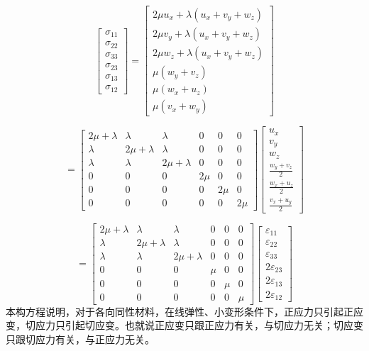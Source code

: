 \documentclass[12pt,a4paper]{article}
\begin{document}
$$
\begin{bmatrix}
\sigma_{11} \\ \sigma_{22} \\ \sigma_{33} \\ \sigma_{23} \\ \sigma_{13} \\ \sigma_{12}
\end{bmatrix} 
=\begin{bmatrix}
2\mu u_x + \lambda (u_x + v_y + w_z)\\
2\mu v_y + \lambda (u_x + v_y + w_z)\\
2\mu w_z + \lambda (u_x + v_y + w_z)\\
\mu (w_y + v_z) \\
\mu (w_x + u_z) \\
\mu (v_x + w_y)
\end{bmatrix}
$$

$$
=\begin{bmatrix}
2\mu+\lambda & \lambda & \lambda & 0 & 0 & 0\\
\lambda & 2\mu+\lambda  & \lambda & 0 & 0 & 0\\
\lambda &  \lambda & 2\mu+\lambda & 0 & 0 & 0 \\
0 & 0 & 0 & 2\mu & 0 & 0 \\
0 & 0 & 0 & 0 & 2\mu & 0 \\
0 & 0 & 0 & 0 & 0 & 2\mu
\end{bmatrix}
\begin{bmatrix}
u_x \\ v_y \\ w_z \\ \frac{w_y + v_z}{2} \\ \frac{w_x + u_z}{2} \\ \frac{v_x + u_y}{2}
\end{bmatrix}
$$

$$
= \begin{bmatrix}
2\mu+\lambda & \lambda & \lambda & 0 & 0 & 0\\
\lambda & 2\mu+\lambda  & \lambda & 0 & 0 & 0\\
\lambda &  \lambda & 2\mu+\lambda & 0 & 0 & 0 \\
0 & 0 & 0 & \mu & 0 & 0 \\
0 & 0 & 0 & 0 & \mu & 0 \\
0 & 0 & 0 & 0 & 0 & \mu
\end{bmatrix}
\begin{bmatrix}
\varepsilon_{11} \\ \varepsilon_{22} \\ \varepsilon_{33} \\ 2\varepsilon_{23} \\ 2\varepsilon_{13} \\ 2\varepsilon_{12}
\end{bmatrix}
$$
本构方程说明，对于各向同性材料，在线弹性、小变形条件下，正应力只引起正应变，切应力只引起切应变。也就说正应变只跟正应力有关，与切应力无关；切应变只跟切应力有关，与正应力无关。
\end{document}
